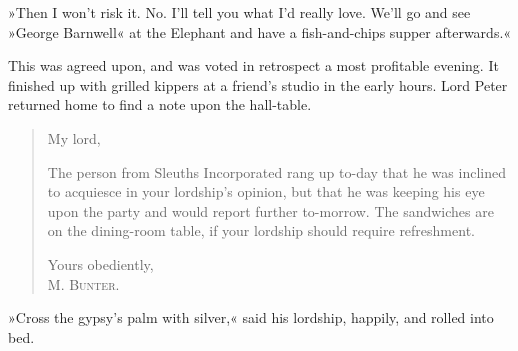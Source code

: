 »Then I won't risk it. No. I'll tell you what I'd really love. We'll go and see »George Barnwell« at the Elephant and have a fish-and-chips supper afterwards.«

This was agreed upon, and was voted in retrospect a most profitable evening. It finished up with grilled kippers at a friend's studio in the early hours. Lord Peter returned home to find a note upon the hall-table.

\begin{quote}
\noindent My lord,

The person from Sleuths Incorporated rang up to-day that he was inclined to acquiesce in your lordship's opinion, but that he was keeping his eye upon the party and would report further to-morrow. The sandwiches are on the dining-room table, if your lordship should require refreshment.

\begin{flushright}
Yours obediently,\\
\textsc{M. Bunter.}
\end{flushright}
\end{quote}

»Cross the gypsy's palm with silver,« said his lordship, happily, and rolled into bed.